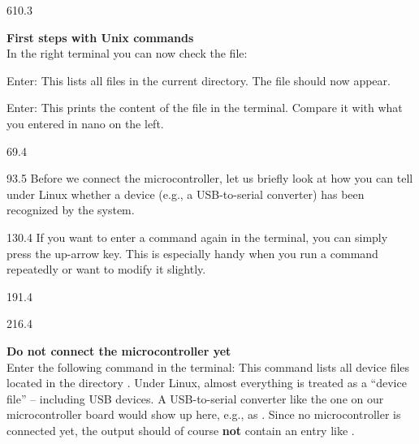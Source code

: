 \documentclass{aslab}
\begin{document}
\begin{region}{610.3}
\begin{tasks}[start=2]
\item \textbf{First steps with Unix commands}\\
  In the right terminal you can now check the file:
  \begin{steps}
  \item Enter:
    \blank
    \blank
    This lists all files in the current directory. The file
     should now appear.
  \item Enter:
    \blank
    \blank
    This prints the content of the file in the terminal. Compare it with
    what you entered in nano on the left.
  \end{steps}
\end{tasks}
\end{region}

\nextpage
\begin{region}{69.4}
\end{region}

\begin{region}{93.5}
Before we connect the microcontroller, let us briefly look at how you can
tell under Linux whether a device (e.g., a USB-to-serial converter) has been
recognized by the system.
\end{region}

\begin{region}{130.4}
If you want to enter a command again in the terminal, you can simply press
the up-arrow key. This is especially handy when you run a command
repeatedly or want to modify it slightly.
\end{region}

\begin{region}{191.4}
\end{region}

\begin{region}{216.4}
\begin{tasks}
\item \textbf{Do not connect the microcontroller yet}\\
  Enter the following command in the terminal:
  \blank
  \blank
  This command lists all device files located in the directory
  . Under Linux, almost everything is treated as a ``device
  file'' -- including USB devices. A USB-to-serial converter like the one on
  our microcontroller board would show up here, e.g., as
  .
  \blank
  Since no microcontroller is connected yet, the output should of course
  \textbf{not} contain an entry like .
\end{tasks}
\end{region}
\end{document}
